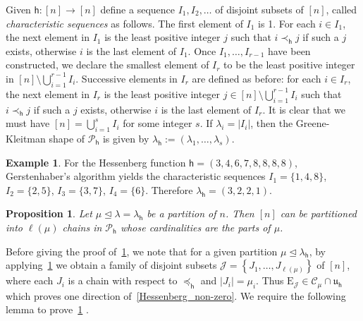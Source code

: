 \documentclass[12pt,a4paper,reqno]{amsart}
\theoremstyle{plain}
\newtheorem{proposition}[theorem]{Proposition}
\theoremstyle{definition}
\newtheorem{example}[theorem]{Example}
\newcommand{\less}{\unlhd}
\newcommand{\1}{\mathds{1}}
\newcommand{\C}{\mathcal{C}}
\newcommand{\E}{\mathrm{E}}
\renewcommand{\u}{\mathfrak{u}}
\newcommand{\hes}{\mathsf{h}}
\begin{document}
    Given $\hes:[n]\to [n]$ define a sequence $I_1,I_2,\ldots$ of disjoint subsets of $[n]$, called \emph{characteristic sequences} as follows. The first element of $I_1$ is 1. For each $i\in I_1$,  the next element in $I_1$ is the least positive integer $j$ such that $i\prec_\hes j$ if such a $j$ exists, otherwise $i$ is the last element of $I_1$. Once $I_1,\ldots,I_{r-1}$ have been constructed, we declare the smallest element of $I_r$ to be the least positive integer in $[n]\setminus \bigcup_{i=1}^{r-1}I_i$. Successive elements in $I_r$ are defined as before: for each $i\in I_r$,  the next element in $I_r$ is the least positive integer $j\in [n]\setminus \bigcup_{i=1}^{r-1}I_i$ such that $i\prec_\hes j$ if such a $j$ exists, otherwise $i$ is the last element of $I_r$. It is clear that we must have $[n]=\bigcup_{i=1}^{s}I_i$ for some integer $s$. If $\lambda_i=|I_i|$, then the Greene-Kleitman shape of $\mathcal{P}_{\hes}$ is given by $\lambda_\hes:=(\lambda_1,\ldots,\lambda_s)$.
  \begin{example}
For the Hessenberg function $\hes=(3,4,6,7,8,8,8,8)$, Gerstenhaber's algorithm yields the characteristic sequences $I_1=\{1,4,8\}$, $I_2=\{2,5\}$, $I_3=\{3,7\}$, $I_4=\{6\}$. Therefore $\lambda_\hes=(3,2,2,1)$.
   \end{example}

\begin{proposition}\label{decomp_poset} Let $\mu\less \lambda=\lambda_\hes$ be a partition of $n$. Then $[n]$ can be partitioned into $\ell(\mu)$ chains in $\mathcal{P}_\hes$ whose cardinalities are the parts of $\mu$.
\end{proposition}
Before giving the proof of~\cref{decomp_poset}, we note that 
for a given partition $\mu\less\lambda_\hes$, by applying~\cref{decomp_poset} we obtain a family of disjoint subsets $\mathcal{J}=\left\{J_1,\dots,J_{\ell(\mu)}\right\}$ of $[n]$, where each $J_i$ is a chain with respect to $\preceq_\hes$ and $|J_i|=\mu_i$. Thus $\E_\mathcal{J}\in \C_\mu\cap\u_\hes$ which proves one direction of~\cref{Hessenberg_non-zero}. We require the following lemma to prove~\cref{decomp_poset} . 
\end{document}
